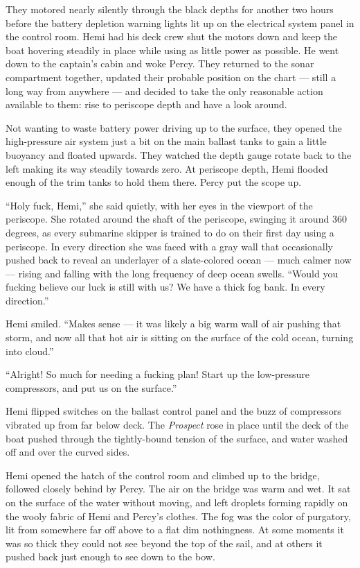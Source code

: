 \documentclass[
]{scrbook}
\begin{document}
\bigskip

They motored nearly silently through the black depths for another two
hours before the battery depletion warning lights lit up on the
electrical system panel in the control room. Hemi had his deck crew shut
the motors down and keep the boat hovering steadily in place while using
as little power as possible. He went down to the captain's cabin and
woke Percy. They returned to the sonar compartment together, updated
their probable position on the chart --- still a long way from anywhere
--- and decided to take the only reasonable action available to them:
rise to periscope depth and have a look around.

Not wanting to waste battery power driving up to the surface, they
opened the high-pressure air system just a bit on the main ballast tanks
to gain a little buoyancy and floated upwards. They watched the depth
gauge rotate back to the left making its way steadily towards zero. At
periscope depth, Hemi flooded enough of the trim tanks to hold them
there. Percy put the scope up.

``Holy fuck, Hemi,'' she said quietly, with her eyes in the viewport of
the periscope. She rotated around the shaft of the periscope, swinging
it around 360 degrees, as every submarine skipper is trained to do on
their first day using a periscope. In every direction she was faced with
a gray wall that occasionally pushed back to reveal an underlayer of a
slate-colored ocean --- much calmer now --- rising and falling with the
long frequency of deep ocean swells. ``Would you fucking believe our
luck is still with us? We have a thick fog bank. In every direction.''

Hemi smiled. ``Makes sense --- it was likely a big warm wall of air
pushing that storm, and now all that hot air is sitting on the surface
of the cold ocean, turning into cloud.''

``Alright! So much for needing a fucking plan! Start up the low-pressure
compressors, and put us on the surface.''

Hemi flipped switches on the ballast control panel and the buzz of
compressors vibrated up from far below deck. The \emph{Prospect} rose in
place until the deck of the boat pushed through the tightly-bound
tension of the surface, and water washed off and over the curved sides.

Hemi opened the hatch of the control room and climbed up to the bridge,
followed closely behind by Percy. The air on the bridge was warm and
wet. It sat on the surface of the water without moving, and left
droplets forming rapidly on the wooly fabric of Hemi and Percy's
clothes. The fog was the color of purgatory, lit from somewhere far off
above to a flat dim nothingness. At some moments it was so thick they
could not see beyond the top of the sail, and at others it pushed back
just enough to see down to the bow.
\end{document}
